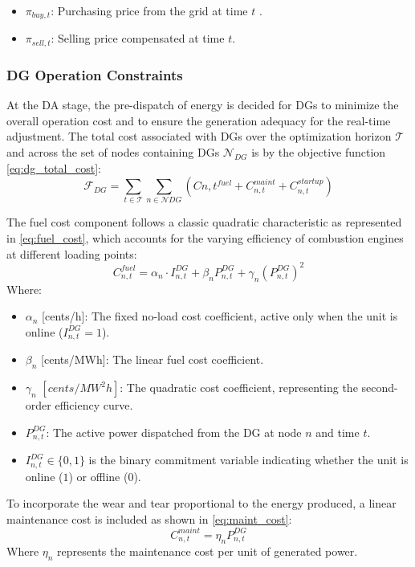\documentclass[preprint,12pt]{elsarticle}
\begin{document}
\begin{itemize}
    \item $\pi_{buy,t}$: Purchasing price from the grid at time $t$ .
    \item $\pi_{sell,t}$: Selling price compensated at time $t$.
\end{itemize}

\subsubsection{DG Operation Constraints}
At the DA stage, the pre-dispatch of energy is decided for DGs to minimize the overall operation cost and to ensure the generation adequacy for the real-time adjustment. The total cost associated with DGs over the optimization horizon $\mathcal{T}$ and across the set of nodes containing DGs $\mathcal{N}_{DG}$ is by the objective function \eqref{eq:dg_total_cost}:
\begin{equation}
\mathcal{F}_{DG} = \sum \limits_{t \in \mathcal{T}} \sum_{n \in \mathcal{N}{DG}} \left( C{n,t}^{fuel} + C_{n,t}^{maint} + C_{n,t}^{startup} \right)
\label{eq:dg_total_cost}
\end{equation}

The fuel cost component follows a classic quadratic characteristic as represented in \eqref{eq:fuel_cost}, which accounts for the varying efficiency of combustion engines at different loading points:
\begin{equation}
C_{n,t}^{fuel} = \alpha_n \cdot I_{n,t}^{DG} + \beta_n P_{n,t}^{DG} + \gamma_n (P_{n,t}^{DG})^2
\label{eq:fuel_cost}
\end{equation}
Where:
\begin{itemize}
    \item $\alpha_n$ [cents/h]: The fixed no-load cost coefficient, active only when the unit is online ($I_{n,t}^{DG}=1$).
    \item $\beta_n$ [cents/MWh]: The linear fuel cost coefficient.
    \item $\gamma_n$ $[cents/MW^2h]$: The quadratic cost coefficient, representing the second-order efficiency curve.
    \item $P_{n,t}^{DG}$: The active power dispatched from the DG at node $n$ and time $t$.
    \item $I_{n,t}^{DG} \in \{0, 1\}$ is the binary commitment variable indicating whether the unit is online ($1$) or offline ($0$).
\end{itemize}

To incorporate the wear and tear proportional to the energy produced, a linear maintenance cost is included as shown in \eqref{eq:maint_cost}:
\begin{equation}
C_{n,t}^{maint} = \eta_n P_{n,t}^{DG}
\label{eq:maint_cost}
\end{equation}
Where $\eta_n$ represents the maintenance cost per unit of generated power.
\end{document}
